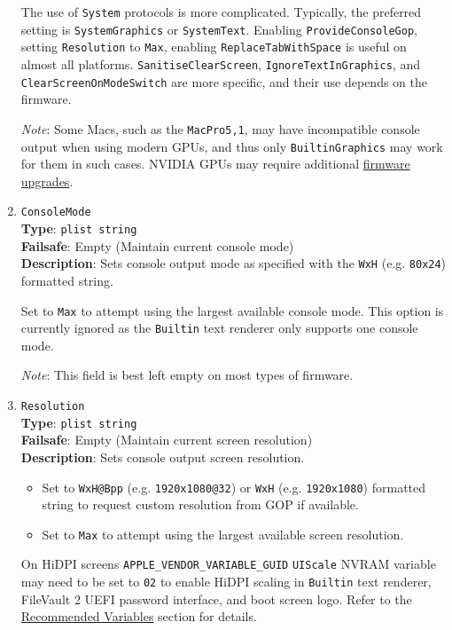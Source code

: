 \documentclass[]{article}
\providecommand{\tightlist}{%
  \setlength{\itemsep}{0pt}\setlength{\parskip}{0pt}}
\begin{document}
\begin{enumerate}
  The use of \texttt{System} protocols is more complicated. Typically,
  the preferred setting is \texttt{SystemGraphics} or \texttt{SystemText}.
  Enabling \texttt{ProvideConsoleGop}, setting \texttt{Resolution} to
  \texttt{Max}, enabling \texttt{ReplaceTabWithSpace} is useful on almost
  all platforms. \texttt{SanitiseClearScreen}, \texttt{IgnoreTextInGraphics},
  and \texttt{ClearScreenOnModeSwitch} are more specific, and their use
  depends on the firmware.

  \emph{Note}: Some Macs, such as the \texttt{MacPro5,1}, may have incompatible
  console output when using modern GPUs, and thus only \texttt{BuiltinGraphics}
  may work for them in such cases. NVIDIA GPUs may require additional
  \href{https://github.com/acidanthera/bugtracker/issues/1280}{firmware upgrades}.

\item
  \texttt{ConsoleMode}\\
  \textbf{Type}: \texttt{plist\ string}\\
  \textbf{Failsafe}: Empty (Maintain current console mode)\\
  \textbf{Description}: Sets console output mode as specified
  with the \texttt{WxH} (e.g. \texttt{80x24}) formatted string.

  Set to \texttt{Max} to attempt using the largest available console mode.
  This option is currently ignored as the \texttt{Builtin} text renderer
  only supports one console mode.

  \emph{Note}: This field is best left empty on most types of firmware.

\item
  \texttt{Resolution}\\
  \textbf{Type}: \texttt{plist\ string}\\
  \textbf{Failsafe}: Empty (Maintain current screen resolution)\\
  \textbf{Description}: Sets console output screen resolution.

  \begin{itemize}
  \tightlist
  \item Set to \texttt{WxH@Bpp} (e.g. \texttt{1920x1080@32}) or \texttt{WxH}
  (e.g. \texttt{1920x1080}) formatted string to request custom resolution
  from GOP if available.
  \item Set to \texttt{Max} to attempt using the largest
  available screen resolution.
  \end{itemize}

  On HiDPI screens \texttt{APPLE\_VENDOR\_VARIABLE\_GUID} \texttt{UIScale}
  NVRAM variable may need to be set to \texttt{02} to enable HiDPI scaling
  in \texttt{Builtin} text renderer, FileVault 2 UEFI password interface,
  and boot screen logo. Refer to the \hyperref[nvramvarsrec]{Recommended Variables}
  section for details.


\end{enumerate}
\end{document}
